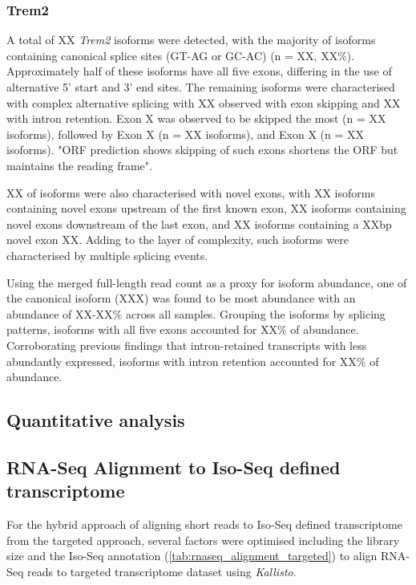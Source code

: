 \subsubsection{Trem2}
A total of XX \textit{Trem2} isoforms were detected, with the majority of isoforms containing canonical splice sites (GT-AG or GC-AC) (n = XX, XX\%). Approximately half of these isoforms have all five exons, differing in the use of alternative 5' start and 3' end sites. The remaining isoforms were characterised with complex alternative splicing with XX observed with exon skipping and XX with intron retention. Exon X was observed to be skipped the most (n = XX isoforms), followed by Exon X (n = XX isoforms), and Exon X (n = XX isoforms). "ORF prediction shows skipping of such exons shortens the ORF but maintains the reading frame". 

XX of isoforms were also characterised with novel exons, with XX isoforms containing novel exons upstream of the first known exon, XX isoforms containing novel exons downstream of the last exon, and XX isoforms containing a XXbp novel exon XX. Adding to the layer of complexity, such isoforms were characterised by multiple splicing events. 

Using the merged full-length read count as a proxy for isoform abundance, one of the canonical isoform (XXX) was found to be most abundance with an abundance of XX-XX\% across all samples. Grouping the isoforms by splicing patterns, isoforms with all five exons accounted for XX\% of abundance. Corroborating previous findings that intron-retained transcripts with less abundantly expressed, isoforms with intron retention accounted for XX\% of abundance.




\newpage
\subsection{Quantitative analysis}
\subsection{RNA-Seq Alignment to Iso-Seq defined transcriptome}
For the hybrid approach of aligning short reads to Iso-Seq defined transcriptome from the targeted approach, several factors were optimised including the library size and the Iso-Seq annotation (\cref{tab:rnaseq_alignment_targeted}) to align RNA-Seq reads to targeted transcriptome dataset using \textit{Kallisto}. 

